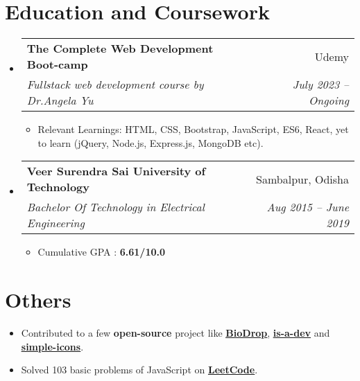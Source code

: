 \documentclass[letterpaper,11pt]{article}
\makeatletter
\newcommand{\resumeItem}[1]{
  \item\small{
    {#1 \vspace{-2pt}}
  }
}
\newcommand{\resumeSubheading}[4]{
  \vspace{-2pt}\item
    \begin{tabular*}{0.97\textwidth}[t]{l@{\extracolsep{\fill}}r}
      \textbf{#1} & #2 \\
      \textit{\small#3} & \textit{\small #4} \\
    \end{tabular*}\vspace{-7pt}
}
\newcommand{\resumeSubHeadingListStart}{\begin{itemize}[leftmargin=0.15in, label={}]}
\newcommand{\resumeSubHeadingListEnd}{\end{itemize}}
\newcommand{\resumeItemListStart}{\begin{itemize}}
\newcommand{\resumeItemListEnd}{\end{itemize}\vspace{-5pt}}
\makeatother
\begin{document}
\section{Education and Coursework} 
  \resumeSubHeadingListStart
    \resumeSubheading
      {The Complete Web Development Boot-camp
}{ Udemy}
      { Fullstack web development course by Dr.Angela Yu}{July 2023 -- Ongoing}
      \resumeItemListStart
        \resumeItem{Relevant Learnings: HTML, CSS, Bootstrap, JavaScript, ES6, React, yet to learn (jQuery, Node.js, Express.js, MongoDB etc).}
      \resumeItemListEnd
    \resumeSubheading
      {Veer Surendra Sai University of Technology}{Sambalpur, Odisha}
      {Bachelor Of Technology in Electrical Engineering}{Aug 2015 -- June 2019}
       \resumeItemListStart
        \resumeItem{Cumulative GPA : \textbf{6.61/10.0}}
      \resumeItemListEnd
  \resumeSubHeadingListEnd

\section{Others}
\begin{itemize}
    \resumeItem{Contributed to a few \textbf{open-source} project like \href{https://github.com/EddieHubCommunity/BioDrop}{{\underline{\textbf{BioDrop}}}}, \href{https://github.com/is-a-dev/register}{{\underline{\textbf{is-a-dev}}}} and \href{https://github.com/simple-icons/simple-icons}{{\underline{\textbf{simple-icons}}}}.}
    \item {Solved 103 basic problems of JavaScript on \href{https://leetcode.com/dushmanta05/}{{\underline{\textbf{LeetCode}}}}}.
\end{itemize}

\end{document}
